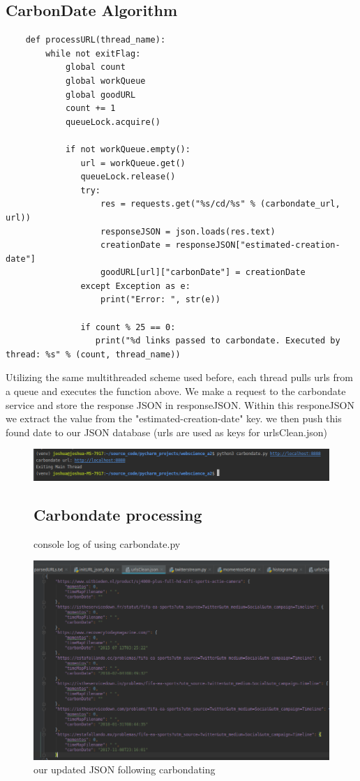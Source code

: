 \documentclass[11pt]{article}
\begin{document}
	\subsection{CarbonDate Algorithm }
	\begin{lstlisting}
	def processURL(thread_name):
	    while not exitFlag:
	        global count
	        global workQueue
	        global goodURL
	        count += 1
	        queueLock.acquire()
	
	        if not workQueue.empty():
	           url = workQueue.get()
	           queueLock.release()
	           try:
	               res = requests.get("%s/cd/%s" % (carbondate_url, url))
	               responseJSON = json.loads(res.text)
	               creationDate = responseJSON["estimated-creation-date"]
	               goodURL[url]["carbonDate"] = creationDate
	           except Exception as e:
	               print("Error: ", str(e))
	
	           if count % 25 == 0:
	              print("%d links passed to carbondate. Executed by thread: %s" % (count, thread_name))
	\end{lstlisting}
	\hspace{10mm} Utilizing the same multithreaded scheme used before, each thread pulls urls from a queue and executes the function above. We make a request to the carbondate service and store the response JSON in responseJSON. Within this responeJSON we extract the value from the "estimated-creation-date" key. we then push this found date to our JSON database (urls are used as keys for urlsClean.json) 
	\begin{figure}[h!]
		\includegraphics[scale=0.5]{resources/carbon_console.png}
		\caption{console log of using carbondate.py}
	\subsection{Carbondate processing}
	\end{figure}
	\begin{figure}[h!]
		\includegraphics[scale=0.5]{resources/carbon_out.png}
		\caption{our updated JSON following carbondating}
	\end{figure}
\end{document}
